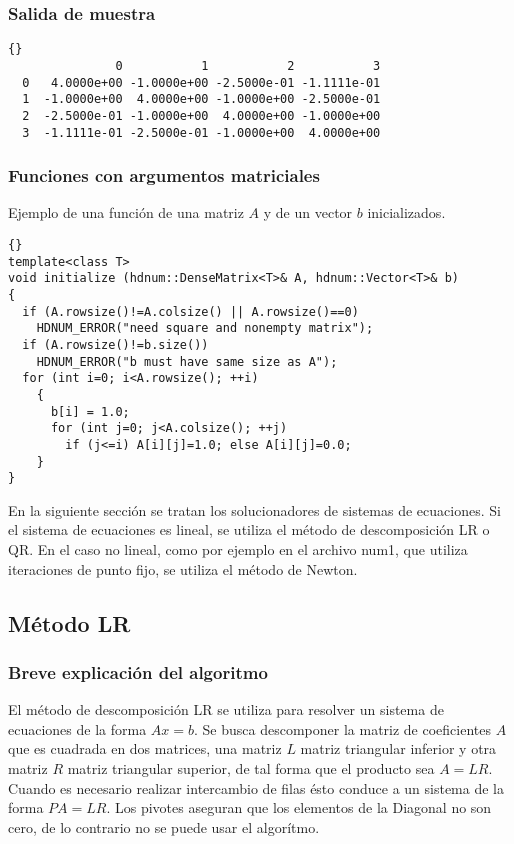 \documentclass[a4paper,11pt]{article}
\theoremstyle{definition}
\begin{document}
\begin{frame}[fragile]
\frametitle{Salida de muestra}
{\footnotesize{\begin{lstlisting}{}
               0           1           2           3
  0   4.0000e+00 -1.0000e+00 -2.5000e-01 -1.1111e-01
  1  -1.0000e+00  4.0000e+00 -1.0000e+00 -2.5000e-01
  2  -2.5000e-01 -1.0000e+00  4.0000e+00 -1.0000e+00
  3  -1.1111e-01 -2.5000e-01 -1.0000e+00  4.0000e+00
\end{lstlisting}}}
\end{frame}

\begin{frame}[fragile]
\frametitle{Funciones con argumentos matriciales}
Ejemplo de una función de una matriz $A$ y de un vector  $b$
inicializados.

{\footnotesize{\begin{lstlisting}{}
template<class T>
void initialize (hdnum::DenseMatrix<T>& A, hdnum::Vector<T>& b)
{
  if (A.rowsize()!=A.colsize() || A.rowsize()==0)
    HDNUM_ERROR("need square and nonempty matrix");
  if (A.rowsize()!=b.size())
    HDNUM_ERROR("b must have same size as A");
  for (int i=0; i<A.rowsize(); ++i)
    {
      b[i] = 1.0;
      for (int j=0; j<A.colsize(); ++j)
        if (j<=i) A[i][j]=1.0; else A[i][j]=0.0;
    }
}
\end{lstlisting}}}
\end{frame}
En la siguiente sección se tratan los solucionadores de sistemas de ecuaciones.
Si el sistema de ecuaciones es lineal, se utiliza el método de descomposición LR 
o QR.  En el caso no lineal, como por ejemplo en el archivo num1, que utiliza 
iteraciones de punto fijo, se utiliza el método de Newton.

\subsection{Método LR}

\subsubsection{Breve explicación del algoritmo}
El método de descomposición LR se utiliza para resolver un sistema
de ecuaciones de la forma $Ax=b$. Se busca descomponer la matriz de coeficientes 
$A$ que es cuadrada en dos matrices, una matriz $L$ matriz triangular inferior y 
otra matriz $R$ matriz triangular superior, de tal forma que el producto sea
$A=LR$. Cuando es necesario realizar intercambio de filas ésto conduce a un 
sistema de la forma $PA = LR$.  Los pivotes aseguran que los elementos de la Diagonal 
no son cero, de lo contrario no se puede usar el algorítmo.
\end{document}
